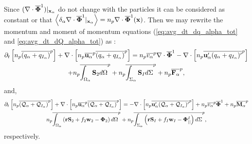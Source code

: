 Since $(\mathbf{\nabla}\cdot\overline{\mathbf{\Phi}}^1)|_{\textbf{x}_\alpha}$ do not change with the particles it can be considered as constant or that $\left<\delta_\alpha \mathbf{\nabla}\cdot\overline{\mathbf{\Phi}}^1|_{\textbf{x}_\alpha}\right>= n_p \mathbf{\nabla}\cdot\overline{\mathbf{\Phi}}^1(\textbf{x})$. 
Then we may rewrite the momentum and moment of momentum equations (\ref{eq:avg_dt_dq_alpha_tot} and \ref{eq:avg_dt_dQ_alpha_tot}) as : 
\begin{multline}
    \partial_t \left[n_p\overline{ (q_\alpha+q_{I_\alpha})}^{p}\right]
    + \mathbf{\nabla} \cdot \left[n_p\overline{\textbf{u}_\alpha}^{p}\overline{(q_\alpha+q_{I_\alpha})}^{p}\right]
    = 
    n_p\overline{v_\alpha}^{p}  \mathbf{\nabla} \cdot\overline{\mathbf{\Phi}}^1
    - \mathbf{\nabla} \cdot \left[n_p\overline{\textbf{u}_\alpha'(q_\alpha+q_{I_\alpha})'}^{p}\right]\\
    + n_p\overline{\int_{\Omega_\alpha} \textbf{S}_2 d\Omega}^{p}
    + n_p\overline{\int_{\Sigma_\alpha} \textbf{S}_I d\Sigma}^{p}
    + n_p\overline{\textbf{F}_\alpha}^{p},
    \label{eq:hybrid_avg_dt_q_alpha}
\end{multline}
and, 
\begin{multline}
    \partial_t \left[n_p\overline{ (\mathcal{Q}_\alpha+\mathcal{Q}_{I_\alpha})}^{p}\right]
    + \mathbf{\nabla} \cdot \left[n_p\overline{\textbf{u}_\alpha}^{p}\overline{(\mathcal{Q}_\alpha+\mathcal{Q}_{I_\alpha})}^{p}\right]
    =
    - \mathbf{\nabla} \cdot \left[n_p\overline{\textbf{u}_\alpha'(\mathcal{Q}_\alpha+\mathcal{Q}_{I_\alpha})'}^{p}\right]
    +n_p\overline{v_\alpha}^{p}\overline{\mathbf{\Phi}}^1
    + n_p\overline{\textbf{M}_\alpha}^{p}\\
    n_p\overline{\int_{\Omega_\alpha} \left(
        \textbf{r} \textbf{S}_2         
        + f_2  \textbf{w}_2 
        - \mathbf{\Phi}_2
        \right) d\Omega}^{p}
        + n_p\overline{\int_{\Sigma_\alpha} \left(
        \textbf{r}\textbf{S}_I
        + f_I \textbf{w}_I
        - \mathbf{\Phi}_{||}^I
    \right) d\Sigma}^{p},
    \label{eq:hybrid_avg_dt_Q_alpha}
\end{multline}
respectively. 

